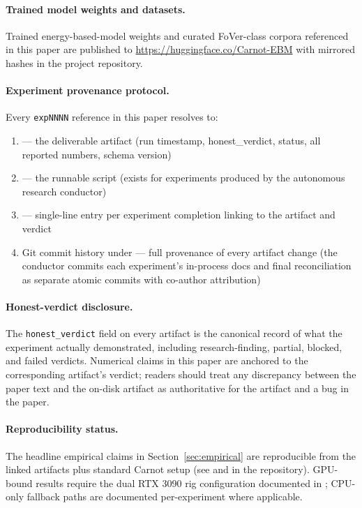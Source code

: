 \documentclass[10pt]{article}
\begin{document}
\paragraph{Trained model weights and datasets.}
Trained energy-based-model weights and curated FoVer-class corpora
referenced in this paper are published to
\url{https://huggingface.co/Carnot-EBM} with mirrored hashes in the
project repository.

\paragraph{Experiment provenance protocol.}
Every \texttt{expNNNN} reference in this paper resolves to:
\begin{enumerate}
  \item {} --- the deliverable
    artifact (run timestamp, honest\_verdict, status, all reported
    numbers, schema version)
  \item {} --- the runnable
    script (exists for experiments produced by the autonomous
    research conductor)
  \item {} --- single-line entry per experiment
    completion linking to the artifact and verdict
  \item Git commit history under  --- full provenance
    of every artifact change (the conductor commits each experiment's
    in-process docs and final reconciliation as separate atomic
    commits with co-author attribution)
\end{enumerate}

\paragraph{Honest-verdict disclosure.}
The \texttt{honest\_verdict} field on every artifact is the canonical
record of what the experiment actually demonstrated, including
research-finding, partial, blocked, and failed verdicts. Numerical
claims in this paper are anchored to the corresponding artifact's
verdict; readers should treat any discrepancy between the paper text
and the on-disk artifact as authoritative for the artifact and a bug
in the paper.

\paragraph{Reproducibility status.}
The headline empirical claims in Section~\ref{sec:empirical} are
reproducible from the linked artifacts plus standard Carnot setup
(see  and  in the repository).
GPU-bound results require the dual RTX 3090 rig configuration
documented in ; CPU-only fallback paths
are documented per-experiment where applicable.
\end{document}
